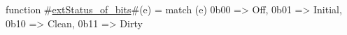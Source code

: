 function #\hyperref[sailRISCVzextStatuszyofzybits]{extStatus\_of\_bits}#(e) =
  match (e) {
    0b00 => Off,
    0b01 => Initial,
    0b10 => Clean,
    0b11 => Dirty
  }
